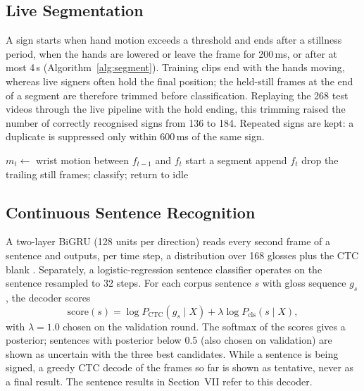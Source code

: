 \documentclass[conference]{IEEEtran}
\begin{document}
\subsection{Live Segmentation}
A sign starts when hand motion exceeds a threshold and ends after a stillness period, when the hands are lowered or leave the frame for 200\,ms, or after at most 4\,s (Algorithm~\ref{alg:segment}). Training clips end with the hands moving, whereas live signers often hold the final position; the held-still frames at the end of a segment are therefore trimmed before classification. Replaying the 268 test videos through the live pipeline with the hold ending, this trimming raised the number of correctly recognised signs from 136 to 184. Repeated signs are kept: a duplicate is suppressed only within 600\,ms of the same sign.

\begin{algorithm}[t]
\caption{Motion segmentation with still-tail trimming}
\label{alg:segment}
\begin{algorithmic}[1]
\STATE $m_t \leftarrow$ wrist motion between $f_{t-1}$ and $f_t$
\STATE start a segment
\STATE append $f_t$
\STATE drop the trailing still frames; classify; return to idle
\ENDIF
\ENDIF
\ENDFOR
\end{algorithmic}
\end{algorithm}

\subsection{Continuous Sentence Recognition}
A two-layer BiGRU (128 units per direction) reads every second frame of a sentence and outputs, per time step, a distribution over 168 glosses plus the CTC blank \cite{graves2006ctc}. Separately, a logistic-regression sentence classifier operates on the sentence resampled to 32 steps. For each corpus sentence $s$ with gloss sequence $g_s$, the decoder scores
\begin{equation}
\mathrm{score}(s) = \log P_{\mathrm{CTC}}(g_s \mid X) + \lambda \log P_{\mathrm{cls}}(s \mid X),
\end{equation}
with $\lambda=1.0$ chosen on the validation round. The softmax of the scores gives a posterior; sentences with posterior below 0.5 (also chosen on validation) are shown as uncertain with the three best candidates. While a sentence is being signed, a greedy CTC decode of the frames so far is shown as tentative, never as a final result. The sentence results in Section~VII refer to this decoder.
\end{document}
